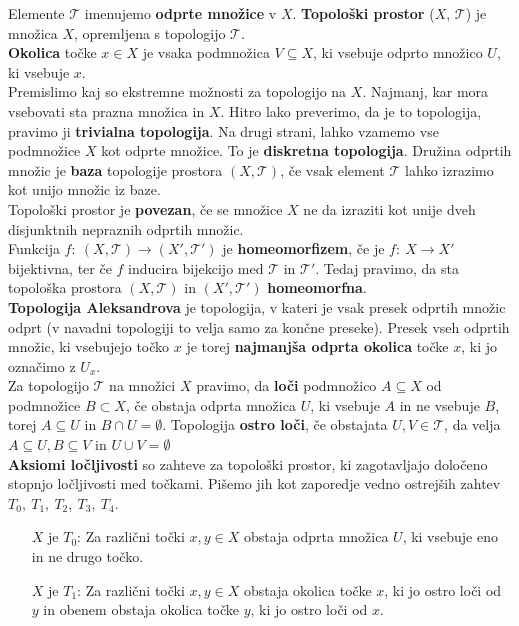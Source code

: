 \documentclass[a4paper, 12pt]{book}
\theoremstyle{definition}
\theoremstyle{remark}
\begin{document}
Elemente $\mathcal{T}$ imenujemo \textbf{odprte množice} v $X$. \textbf{Topološki prostor}
($X$, $\mathcal{T}$) je množica $X$, opremljena s topologijo $\mathcal{T}$.\\
\textbf{Okolica} točke $x \in X$ je vsaka podmnožica $V \subseteq X$, ki vsebuje
odprto množico $U$, ki vsebuje $x$.\\
Premislimo kaj so ekstremne možnosti za topologijo na $X$.
Najmanj, kar mora vsebovati sta prazna množica in $X$. Hitro lako preverimo, da
je to topologija, pravimo ji \textbf{trivialna topologija}. Na drugi strani,
lahko vzamemo vse podmnožice $X$ kot odprte množice. To je \textbf{diskretna topologija}.
Družina odprtih množic je \textbf{baza} topologije prostora $(X,\mathcal{T})$, če 
vsak element $\mathcal{T}$ lahko izrazimo kot unijo množic iz baze.\\
Topološki prostor je \textbf{povezan}, če se množice $X$ ne da izraziti kot unije
dveh disjunktnih nepraznih odprtih množic.\\
Funkcija $f:\ (X,\mathcal{T}) \rightarrow (X',\mathcal{T}')$ je \textbf{homeomorfizem}, če je
$f:\ X \rightarrow X'$ bijektivna, ter če $f$ inducira bijekcijo med $\mathcal{T}$ in $\mathcal{T}'$.
Tedaj pravimo, da sta topološka prostora $(X,\mathcal{T})$ in $(X',\mathcal{T}')$ \textbf{homeomorfna}.\\
\textbf{Topologija Aleksandrova} je topologija, v kateri je vsak presek odprtih
množic odprt (v navadni topologiji to velja samo za končne preseke). Presek vseh odprtih množic, 
ki vsebujejo točko $x$ je torej \textbf{najmanjša odprta okolica} točke $x$, ki jo označimo z $U_x$.\\
Za topologijo $\mathcal{T}$ na množici $X$ pravimo, da \textbf{loči} podmnožico $A \subseteq X$
od podmnožice $B \subset X$, če obstaja odprta množica $U$, ki vsebuje $A$ in ne vsebuje $B$,
torej $A \subseteq U$ in $B \cap U = \emptyset$. Topologija \textbf{ostro loči}, če obstajata
$U,V \in \mathcal{T}$, da velja $A \subseteq U, B \subseteq V$ in $U \cup V = \emptyset$ \\
\textbf{Aksiomi ločljivosti} so zahteve za topološki prostor, ki zagotavljajo določeno
stopnjo ločljivosti med točkami. Pišemo jih kot zaporedje vedno ostrejših zahtev
$T_0,\ T_1,\ T_2,\ T_3,\ T_4$.\\

\begin{itemize}
  \item[$X$] je $T_0$: Za različni točki $x,y \in X$ obstaja odprta množica $U$, ki vsebuje
  eno in ne drugo točko.
  \item[$X$] je $T_1$: Za različni točki $x,y \in X$ obstaja okolica točke $x$, ki jo
  ostro loči od $y$ in obenem obstaja okolica točke $y$, ki jo ostro loči od $x$.
\end{itemize}
\end{document}
